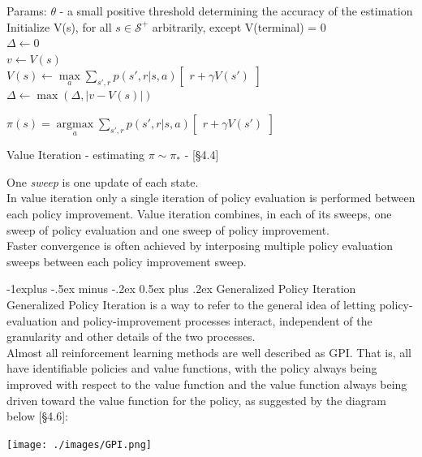 \documentclass[10pt,landscape]{article}
\makeatletter
\renewcommand{\subsection}{\@startsection{subsection}{2}{0mm}%
                                {-1explus -.5ex minus -.2ex}%
                                {0.5ex plus .2ex}%
                                {\normalfont\normalsize\bfseries}}
\DeclareMathOperator*{\argmax}{argmax}
\makeatother
\begin{document}
\begin{multicols}{3}
\begin{algorithm}[H]
Params: $\theta$ - a small positive threshold determining the accuracy of the estimation \\
Initialize V(s), for all $s \in \mathcal{S}^{+}$ arbitrarily, except V(terminal) = 0\\
 $\Delta \leftarrow 0$ \\
\While{$\Delta \ge \theta$}
{
   {
        $v \leftarrow V(s)$\\
        $V(s) \leftarrow \max\limits_a \sum\limits_{s', r} p(s',r | s, a) \begin{bmatrix}
                r + \gamma V(s')
        \end{bmatrix}$ \\
        $\Delta \leftarrow \max(\Delta, | v - V(s)|)$
        }
}

 $\pi(s) = \argmax\limits_a \sum\limits_{s', r} p(s',r | s, a) \begin{bmatrix}
     r + \gamma V(s')
  \end{bmatrix}$
\caption{Value Iteration - estimating  $\pi \sim \pi_*$ - [§4.4]}
\end{algorithm}
One \emph{sweep} is one update of each state.\\
In value iteration only a single iteration of policy evaluation is performed between each policy improvement. 
Value iteration combines, in each of its sweeps, one sweep of policy evaluation and one sweep of policy improvement.\\ Faster convergence is often achieved by interposing multiple policy evaluation sweeps between each policy improvement sweep.

\subsection{Generalized Policy Iteration}
Generalized Policy Iteration is a way to refer to the general idea of letting policy-evaluation and policy-improvement processes interact, independent of the granularity and other details of the two processes. \\
Almost all reinforcement learning methods are well described as GPI. That is, all have identifiable policies and value functions, with the policy always being improved with respect to the value function and the value function always being driven toward the value function for the policy, as suggested by the diagram below [§4.6]:
\begin{center}
\texttt{[image: ./images/GPI.png]}
\end{center}


\end{multicols}
\end{document}
